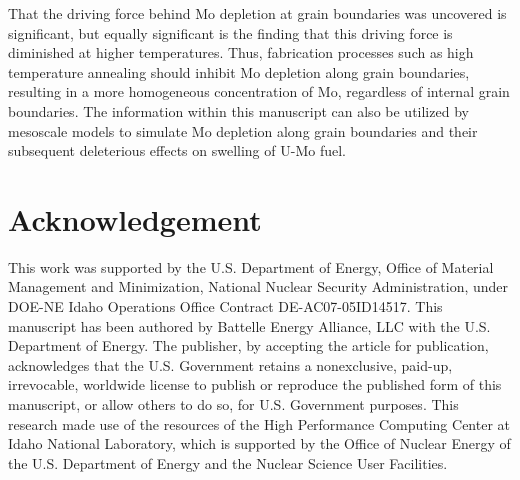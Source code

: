 \documentclass[review]{elsarticle}
\begin{document}
That the driving force behind Mo depletion at grain boundaries was uncovered is significant, but equally significant is the finding that this driving force is diminished at higher temperatures. Thus, fabrication processes such as high temperature annealing should inhibit Mo depletion along grain boundaries, resulting in a more homogeneous concentration of Mo, regardless of internal grain boundaries. The information within this manuscript can also be utilized by mesoscale models to simulate Mo depletion along grain boundaries and their subsequent deleterious effects on swelling of U-Mo fuel.

\section{Acknowledgement}
This work was supported by the U.S. Department of Energy, Office of Material Management and Minimization, National Nuclear Security Administration, under DOE-NE Idaho Operations Office Contract DE-AC07-05ID14517. This manuscript has been authored by Battelle Energy Alliance, LLC with the U.S. Department of Energy. The publisher, by accepting the article for publication, acknowledges that the U.S. Government retains a nonexclusive, paid-up, irrevocable, worldwide license to publish or reproduce the published form of this manuscript, or allow others to do so, for U.S. Government purposes. This research made use of the resources of the High Performance Computing Center at Idaho National Laboratory, which is supported by the Office of Nuclear Energy of the U.S. Department of Energy and the Nuclear Science User Facilities.


\end{document}
